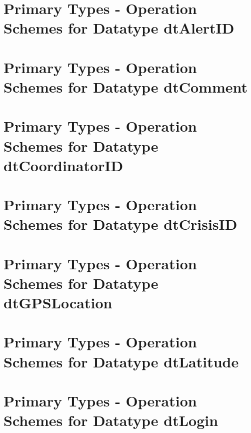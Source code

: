 


\section{Primary Types - Operation Schemes for Datatype dtAlertID} 
\label{OM-CM-PTDataType-dtAlertID}

\section{Primary Types - Operation Schemes for Datatype dtComment} 
\label{OM-CM-PTDataType-dtComment}

\section{Primary Types - Operation Schemes for Datatype dtCoordinatorID} 
\label{OM-CM-PTDataType-dtCoordinatorID}

\section{Primary Types - Operation Schemes for Datatype dtCrisisID} 
\label{OM-CM-PTDataType-dtCrisisID}

\section{Primary Types - Operation Schemes for Datatype dtGPSLocation} 
\label{OM-CM-PTDataType-dtGPSLocation}


\section{Primary Types - Operation Schemes for Datatype dtLatitude} 
\label{OM-CM-PTDataType-dtLatitude}

\section{Primary Types - Operation Schemes for Datatype dtLogin} 
\label{OM-CM-PTDataType-dtLogin}

